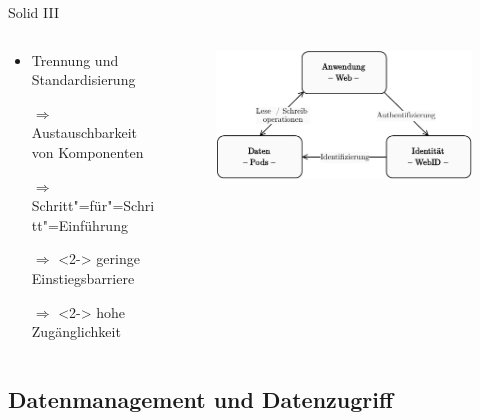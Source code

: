 \begin{frame}{Solid III \footnotesize\cite{mecklerWebLinkedData2023}}
    \begin{columns}
        \begin{column}{0.4\textwidth}
            \begin{itemize}
                \item Trennung und Standardisierung
                \item[$\Rightarrow$] Austauschbarkeit von Komponenten
                \item[$\Rightarrow$] Schritt"=für"=Schritt"=Einführung
                
                \item[$\Rightarrow$]<2-> geringe Einstiegsbarriere
                \item[$\Rightarrow$]<2-> hohe Zugänglichkeit
            \end{itemize}
        \end{column}
        
        \begin{column}{0.6\textwidth}
            \begin{figure}
                \includegraphics[width=\textwidth]{./assets/solid_triangle.drawio.pdf}
            \end{figure}
        \end{column}
    \end{columns}
\end{frame}


\subsection{Datenmanagement und Datenzugriff}


